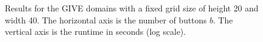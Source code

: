 \begin{figure}[t]
  \caption{Results for the GIVE domains with a fixed grid size of
  height 20 and width 40. The horizontal axis is the number of buttons $b$.
  The vertical axis is the runtime in seconds (log scale).}
  \label{fig:give-buttons}
\end{figure}





